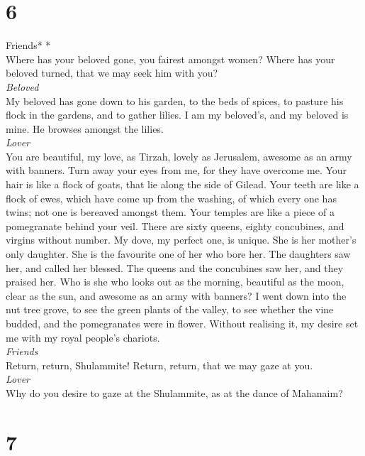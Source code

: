 \hypertarget{section-5}{%
\section{6}\label{section-5}}

\emph{\hfill\break
}Friends* *\\

 Where has your beloved gone, you fairest amongst women?
Where has your beloved turned, that we may seek him with you?\\
\emph{Beloved}\\
 My beloved has gone down to his garden, to the beds of
spices, to pasture his flock in the gardens, and to gather lilies.
 I am my beloved's, and my beloved is mine. He browses
amongst the lilies.\\
\emph{Lover}\\
 You are beautiful, my love, as Tirzah, lovely as
Jerusalem, awesome as an army with banners.  Turn away
your eyes from me, for they have overcome me. Your hair is like a flock
of goats, that lie along the side of Gilead.  Your teeth
are like a flock of ewes, which have come up from the washing, of which
every one has twins; not one is bereaved amongst them. 
Your temples are like a piece of a pomegranate behind your veil.
 There are sixty queens, eighty concubines, and virgins
without number.  My dove, my perfect one, is unique. She
is her mother's only daughter. She is the favourite one of her who bore
her. The daughters saw her, and called her blessed. The queens and the
concubines saw her, and they praised her.  Who is she who
looks out as the morning, beautiful as the moon, clear as the sun, and
awesome as an army with banners?  I went down into the
nut tree grove, to see the green plants of the valley, to see whether
the vine budded, and the pomegranates were in flower. 
Without realising it, my desire set me with my royal people's
chariots.\\
\emph{Friends}\\
 Return, return, Shulammite! Return, return, that we may
gaze at you.\\
\emph{Lover}\\
Why do you desire to gaze at the Shulammite, as at the dance of
Mahanaim?

\hypertarget{section-6}{%
\section{7}\label{section-6}}

